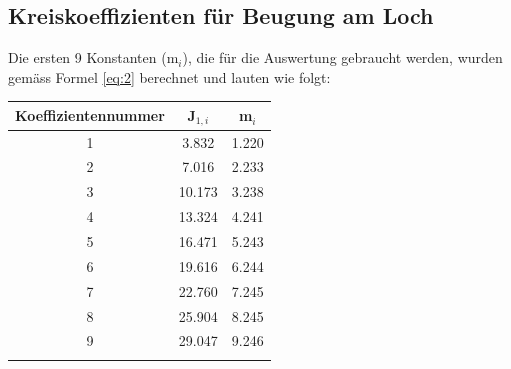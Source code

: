 \subsection{Kreiskoeffizienten für Beugung am Loch}
Die ersten 9 Konstanten (m$_{i}$), die für die Auswertung gebraucht werden, wurden gemäss Formel \ref{eq:2} berechnet und lauten wie folgt:\\

\begin{tabular}[h]{ccc}
Koeffizientennummer & J$_{1,i}$ & m$_{i}$ \\ 
\hline 
1 & 3.832 & 1.220 \\  
2 & 7.016 & 2.233 \\  
3 & 10.173 & 3.238 \\ 
4 & 13.324 & 4.241 \\ 
5 & 16.471 & 5.243 \\ 
6 & 19.616 & 6.244 \\  
7 & 22.760 & 7.245 \\ 
8 & 25.904 & 8.245 \\ 
9 & 29.047 & 9.246 \\ 
\label{table:Koeff}
\end{tabular} 
